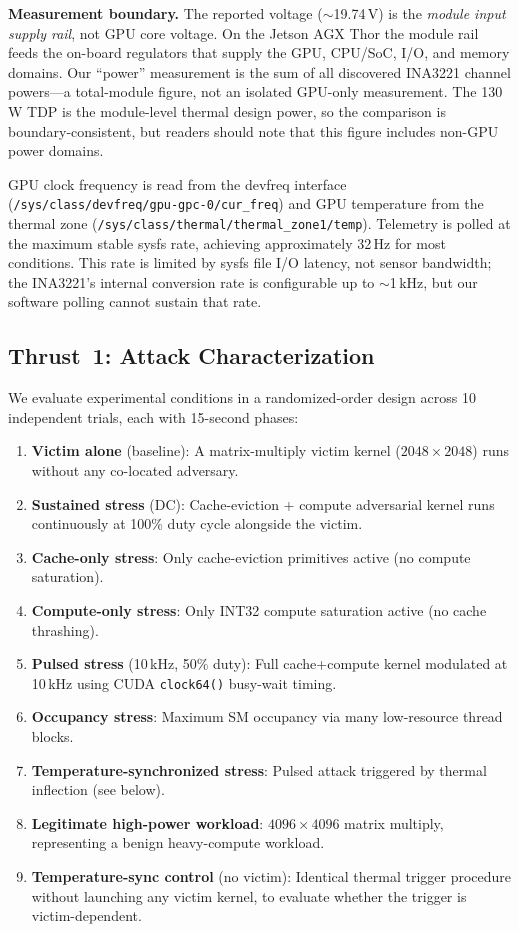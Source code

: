 \documentclass[conference]{IEEEtran}
\begin{document}
\textbf{Measurement boundary.}  The reported voltage
($\sim$19.74\,V) is the \emph{module input supply rail}, not GPU core
voltage.  On the Jetson AGX Thor the module rail feeds the on-board
regulators that supply the GPU, CPU/SoC, I/O, and memory domains.
Our ``power'' measurement is the sum of all discovered INA3221 channel
powers---a total-module figure, not an isolated GPU-only measurement.
The 130\,W TDP is the module-level thermal design power, so the
comparison is boundary-consistent, but readers should note that this
figure includes non-GPU power domains.

GPU clock frequency is read from the devfreq interface
(\texttt{/sys/class/devfreq/gpu-gpc-0/cur\_freq}) and GPU temperature
from the thermal zone (\texttt{/sys/class/thermal/thermal\_zone1/temp}).
Telemetry is polled at the maximum stable sysfs rate, achieving
approximately 32\,Hz for most conditions.  This rate is limited by
sysfs file I/O latency, not sensor bandwidth; the INA3221's internal
conversion rate is configurable up to $\sim$1\,kHz, but our
software polling cannot sustain that rate.

\subsection{Thrust~1: Attack Characterization}

We evaluate experimental conditions in a randomized-order design
across 10 independent trials, each with 15-second phases:

\begin{enumerate}
\item \textbf{Victim alone} (baseline): A matrix-multiply victim
  kernel ($2048 \times 2048$) runs without any co-located adversary.
\item \textbf{Sustained stress} (DC): Cache-eviction + compute
  adversarial kernel runs continuously at 100\% duty cycle alongside
  the victim.
\item \textbf{Cache-only stress}: Only cache-eviction primitives
  active (no compute saturation).
\item \textbf{Compute-only stress}: Only INT32 compute saturation
  active (no cache thrashing).
\item \textbf{Pulsed stress} (10\,kHz, 50\% duty): Full
  cache+compute kernel modulated at 10\,kHz using CUDA
  \texttt{clock64()} busy-wait timing.
\item \textbf{Occupancy stress}: Maximum SM occupancy via many
  low-resource thread blocks.
\item \textbf{Temperature-synchronized stress}: Pulsed attack
  triggered by thermal inflection (see below).
\item \textbf{Legitimate high-power workload}: $4096 \times 4096$
  matrix multiply, representing a benign heavy-compute workload.
\item \textbf{Temperature-sync control} (no victim): Identical
  thermal trigger procedure without launching any victim kernel, to
  evaluate whether the trigger is victim-dependent.
\end{enumerate}
\end{document}
